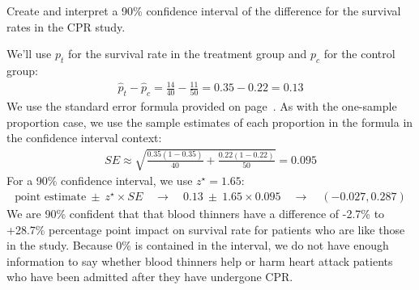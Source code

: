 \begin{examplewrap}
\begin{nexample}{
    Create and interpret a 90\% confidence interval of the
    difference for the survival rates in the CPR study.}

  We'll use $p_t$ for the survival
  rate in the treatment group and $p_c$ for the control
  group:
  \begin{align*}
  \hat{p}_{t} - \hat{p}_{c}
    = \frac{14}{40} - \frac{11}{50}
    = 0.35 - 0.22
    = 0.13
  \end{align*}
  We use the standard error formula provided on
  page~\pageref{seForDiffOfProp}.
  As with the one-sample proportion case,
  we use the sample estimates of each proportion
  in the formula in the confidence interval context:
  \begin{align*}
  SE \approx \sqrt{\frac{0.35 (1 - 0.35)}{40} +
      \frac{0.22 (1 - 0.22)}{50}}
    = 0.095
  \end{align*}
  For a 90\% confidence interval, we use $z^{\star} = 1.65$:
  \begin{align*}
  \text{point estimate} \ \pm\ z^{\star} \times SE
    \quad \to \quad 0.13 \ \pm\ 1.65 \times  0.095
    \quad \to \quad (-0.027, 0.287)
  \end{align*}
  We are 90\% confident that that blood thinners have
  a difference of -2.7\% to +28.7\% percentage point
  impact on survival rate for patients who are like
  those in the study.
  Because 0\% is contained in the interval,
  we do not have enough information to say
  whether blood thinners help or harm
  heart attack patients who have been admitted after
  they have undergone CPR.
\end{nexample}
\end{examplewrap}



